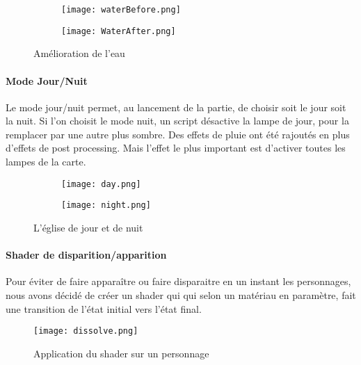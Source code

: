         
        \begin{figure}[hbt!]
            \begin{subfigure}[b]{0.49\textwidth}
                \texttt{[image: waterBefore.png]}
            \end{subfigure}
            \begin{subfigure}[b]{0.49\textwidth}
                \texttt{[image: WaterAfter.png]}
            \end{subfigure}
            \caption{Amélioration de l'eau}
        \end{figure}
        \FloatBarrier



        \paragraph{Mode Jour/Nuit}
        Le mode jour/nuit permet, au lancement de la partie,
        de choisir soit le jour soit la nuit. Si l'on choisit le mode nuit, un script désactive la lampe de jour,
        pour la remplacer par une autre plus sombre. Des effets de pluie ont été rajoutés en plus d'effets de post processing.
        Mais l'effet le plus important est d'activer toutes les lampes de la carte.
    

        \begin{figure}[hbt!]
            \begin{subfigure}[b]{0.49\textwidth}
                \texttt{[image: day.png]}
            \end{subfigure}
            \begin{subfigure}[b]{0.5\textwidth}
                \texttt{[image: night.png]}
            \end{subfigure}
            \caption{L'église de jour et de nuit}
        \end{figure}
        \FloatBarrier

        \paragraph{Shader de disparition/apparition}
        Pour éviter de faire apparaître ou faire disparaitre en un instant les personnages, nous avons décidé de créer un shader qui qui selon un matériau en paramètre, 
        fait une transition de l'état initial vers l'état final. 
        \begin{figure}[hbt!]
            \centering
            \texttt{[image: dissolve.png]}
            \caption{Application du shader sur un personnage}

        \end{figure}
        \FloatBarrier

